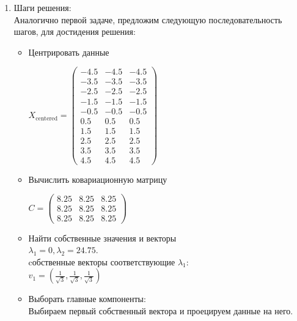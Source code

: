 \begin{enumerate}
   \item Шаги решения:\\
   Аналогично первой задаче, предложим следующую последовательность шагов, для достидения решения: \\
   \begin{itemize} 
       \item Центрировать данные \\
        \begin{center}
        $X_\text{centered} = 
             \begin{pmatrix}
              -4.5 & -4.5 & -4.5 \\
              -3.5 & -3.5 & -3.5 \\
              -2.5 & -2.5 & -2.5 \\
              -1.5 & -1.5 & -1.5 \\
              -0.5 & -0.5 & -0.5 \\
              0.5 & 0.5 & 0.5    \\
              1.5 & 1.5 & 1.5    \\
              2.5 & 2.5 & 2.5    \\
              3.5 & 3.5 & 3.5    \\
              4.5 & 4.5 & 4.5
             \end{pmatrix}$\par
    \end{center}
    \item Вычислить ковариационную матрицу \\
       \begin{center}
        $C= 
             \begin{pmatrix}
              8.25 & 8.25 & 8.25    \\
              8.25 & 8.25 & 8.25    \\
              8.25 & 8.25 & 8.25
             \end{pmatrix}$\par
    \end{center}
    \item Найти собственные значения и векторы \\ 
       $\lambda_1 = 0, \lambda_2 = 24.75$.\\  
       cобственные векторы соответствующие $\lambda_1$:  \\
       $v_1 = (\frac{1}{\sqrt{3}}, \frac{1}{\sqrt{3}}, \frac{1}{\sqrt{3}})$ 
    \item Выборать главные компоненты: \\
        Выбираем первый собственный вектора и проецируем данные на него.
   \end{itemize}


\end{enumerate}
